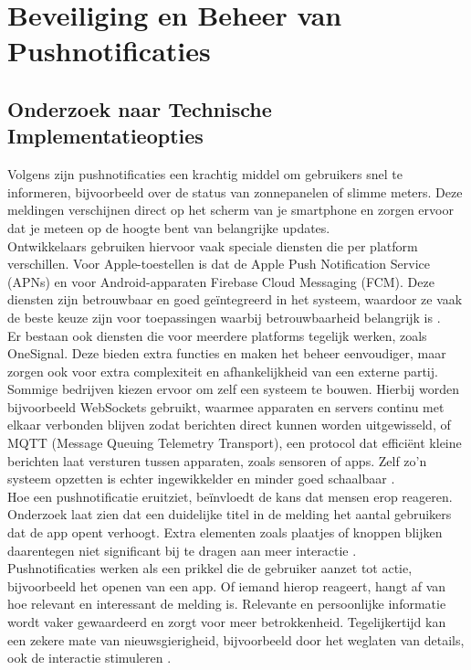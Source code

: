 \section{Beveiliging en Beheer van Pushnotificaties}
\label{sec:pushnotificaties}

\subsection{Onderzoek naar Technische Implementatieopties}
Volgens \textcite{Wohllebe2021} zijn pushnotificaties een krachtig middel om gebruikers snel te informeren, bijvoorbeeld over de status van zonnepanelen of slimme meters. Deze meldingen verschijnen direct op het scherm van je smartphone en zorgen ervoor dat je meteen op de hoogte bent van belangrijke updates.\\

Ontwikkelaars gebruiken hiervoor vaak speciale diensten die per platform verschillen. Voor Apple-toestellen is dat de Apple Push Notification Service (APNs) en voor Android-apparaten Firebase Cloud Messaging (FCM). Deze diensten zijn betrouwbaar en goed geïntegreerd in het systeem, waardoor ze vaak de beste keuze zijn voor toepassingen waarbij betrouwbaarheid belangrijk is \autocite{Wohllebe2021}.\\

Er bestaan ook diensten die voor meerdere platforms tegelijk werken, zoals OneSignal. Deze bieden extra functies en maken het beheer eenvoudiger, maar zorgen ook voor extra complexiteit en afhankelijkheid van een externe partij. Sommige bedrijven kiezen ervoor om zelf een systeem te bouwen. Hierbij worden bijvoorbeeld WebSockets gebruikt, waarmee apparaten en servers continu met elkaar verbonden blijven zodat berichten direct kunnen worden uitgewisseld, of MQTT (Message Queuing Telemetry Transport), een protocol dat efficiënt kleine berichten laat versturen tussen apparaten, zoals sensoren of apps. Zelf zo'n systeem opzetten is echter ingewikkelder en minder goed schaalbaar \textcite{Wohllebe2021}.\\

Hoe een pushnotificatie eruitziet, beïnvloedt de kans dat mensen erop reageren. Onderzoek laat zien dat een duidelijke titel in de melding het aantal gebruikers dat de app opent verhoogt. Extra elementen zoals plaatjes of knoppen blijken daarentegen niet significant bij te dragen aan meer interactie \autocite{Wohllebe2021}.\\

Pushnotificaties werken als een prikkel die de gebruiker aanzet tot actie, bijvoorbeeld het openen van een app. Of iemand hierop reageert, hangt af van hoe relevant en interessant de melding is. Relevante en persoonlijke informatie wordt vaker gewaardeerd en zorgt voor meer betrokkenheid. Tegelijkertijd kan een zekere mate van nieuwsgierigheid, bijvoorbeeld door het weglaten van details, ook de interactie stimuleren \autocite{Wohllebe2021}.\\


